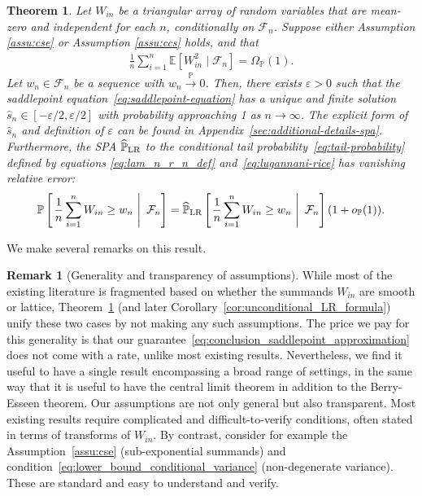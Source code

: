 \documentclass[12pt]{article}
\newtheorem{theorem}{Theorem}
\theoremstyle{definition}
\newtheorem{remark}{Remark}
\def\P{\mathbb{P}}
\def\P{\mathbb{P}}
\newcommand{\E}{\mathbb E}								%
\renewcommand{\P}{\mathbb{P}}							%
\begin{document}
  \begin{theorem}\label{thm:unified_unnormalized_moment_conditions}
	  Let $W_{in}$ be a triangular array of random variables that are mean-zero and independent for each $n$, conditionally on $\mathcal F_n$. Suppose either Assumption \ref{assu:cse} or Assumption \ref{assu:ccs} holds, and that
	  \begin{align}\label{eq:lower_bound_conditional_variance}
		  \frac{1}{n}\sum_{i=1}^n \E[W_{in}^2 \mid \mathcal{F}_n]=\Omega_{\P}(1).
	  \end{align}
	  Let $w_n \in \mathcal F_n$ be a sequence with $w_n \overset{\P} \rightarrow 0$. Then, there exists $\varepsilon>0$ such that the saddlepoint equation~\eqref{eq:saddlepoint-equation} has a unique and finite solution $\hat s_n \in [-\varepsilon/2, \varepsilon/2]$ with probability approaching 1 as $n \rightarrow \infty$. The explicit form of $\hat s_n$ and definition of $\varepsilon$ can be found in Appendix~\ref{sec:additional-details-spa}. Furthermore, the SPA $\widehat{\P}_{\textnormal{LR}}$ to the conditional tail probability~\eqref{eq:tail-probability} defined by equations \eqref{eq:lam_n_r_n_def} and~\eqref{eq:lugannani-rice} has vanishing relative error:
	  \begin{align}\label{eq:conclusion_saddlepoint_approximation}
		\P\left[\left.\frac{1}{n}\sum_{i = 1}^n W_{in} \geq w_n\ \right|\ \mathcal{F}_n\right] = \widehat{\P}_{\textnormal{LR}}\left[\left.\frac{1}{n}\sum_{i = 1}^n W_{in} \geq w_n\ \right|\ \mathcal{F}_n\right](1+o_{\P}(1)).
	  \end{align}
  \end{theorem}
  We make several remarks on this result.
  \begin{remark}[Generality and transparency of assumptions]\label{rmk:generality-transparency}
	While most of the existing literature is fragmented based on whether the summands $W_{in}$ are smooth or lattice, Theorem~\ref{thm:unified_unnormalized_moment_conditions} (and later Corollary~\ref{cor:unconditional_LR_formula}) unify these two cases by not making any such assumptions. The price we pay for this generality is that our guarantee~\eqref{eq:conclusion_saddlepoint_approximation} does not come with a rate, unlike most existing results. Nevertheless, we find it useful to have a single result encompassing a broad range of settings, in the same way that it is useful to have the central limit theorem in addition to the Berry-Esseen theorem. Our assumptions are not only general but also transparent. Most existing results require complicated and difficult-to-verify conditions, often stated in terms of transforms of $W_{in}$. By contrast, consider for example the Assumption~\ref{assu:cse} (sub-exponential summands) and condition~\eqref{eq:lower_bound_conditional_variance} (non-degenerate variance). These are standard and easy to understand and verify.
  \end{remark}
  
\end{document}

